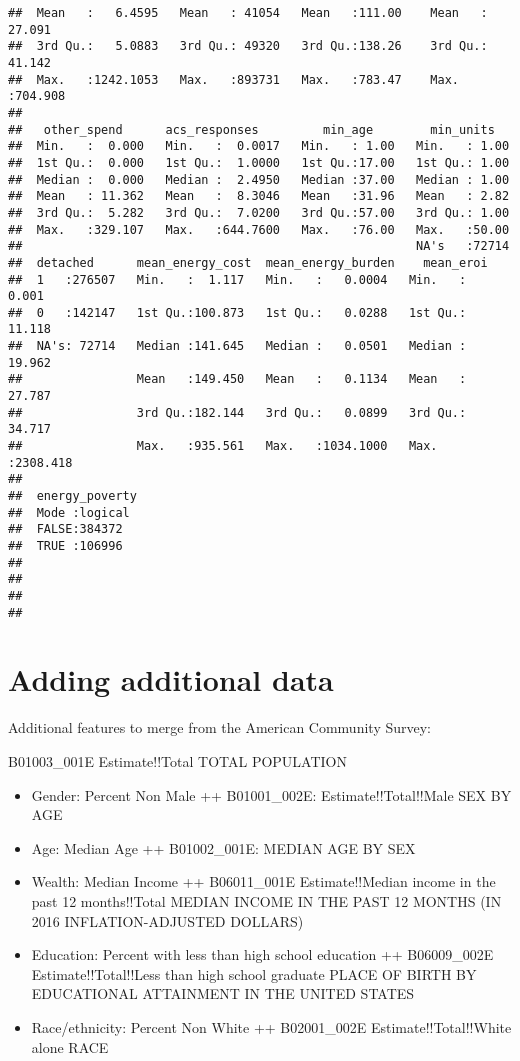 \documentclass[]{article}
\providecommand{\tightlist}{%
  \setlength{\itemsep}{0pt}\setlength{\parskip}{0pt}}
\begin{document}
\begin{verbatim}
##  Mean   :   6.4595   Mean   : 41054   Mean   :111.00    Mean   : 27.091  
##  3rd Qu.:   5.0883   3rd Qu.: 49320   3rd Qu.:138.26    3rd Qu.: 41.142  
##  Max.   :1242.1053   Max.   :893731   Max.   :783.47    Max.   :704.908  
##                                                                          
##   other_spend      acs_responses         min_age        min_units    
##  Min.   :  0.000   Min.   :  0.0017   Min.   : 1.00   Min.   : 1.00  
##  1st Qu.:  0.000   1st Qu.:  1.0000   1st Qu.:17.00   1st Qu.: 1.00  
##  Median :  0.000   Median :  2.4950   Median :37.00   Median : 1.00  
##  Mean   : 11.362   Mean   :  8.3046   Mean   :31.96   Mean   : 2.82  
##  3rd Qu.:  5.282   3rd Qu.:  7.0200   3rd Qu.:57.00   3rd Qu.: 1.00  
##  Max.   :329.107   Max.   :644.7600   Max.   :76.00   Max.   :50.00  
##                                                       NA's   :72714  
##  detached      mean_energy_cost  mean_energy_burden    mean_eroi       
##  1   :276507   Min.   :  1.117   Min.   :   0.0004   Min.   :   0.001  
##  0   :142147   1st Qu.:100.873   1st Qu.:   0.0288   1st Qu.:  11.118  
##  NA's: 72714   Median :141.645   Median :   0.0501   Median :  19.962  
##                Mean   :149.450   Mean   :   0.1134   Mean   :  27.787  
##                3rd Qu.:182.144   3rd Qu.:   0.0899   3rd Qu.:  34.717  
##                Max.   :935.561   Max.   :1034.1000   Max.   :2308.418  
##                                                                        
##  energy_poverty 
##  Mode :logical  
##  FALSE:384372   
##  TRUE :106996   
##                 
##                 
##                 
## 
\end{verbatim}

\hypertarget{adding-additional-data}{%
\section{Adding additional data}\label{adding-additional-data}}

Additional features to merge from the American Community Survey:

B01003\_001E Estimate!!Total TOTAL POPULATION

\begin{itemize}
\tightlist
\item
  Gender: Percent Non Male ++ B01001\_002E: Estimate!!Total!!Male SEX BY
  AGE
\item
  Age: Median Age ++ B01002\_001E: MEDIAN AGE BY SEX
\item
  Wealth: Median Income ++ B06011\_001E Estimate!!Median income in the
  past 12 months!!Total MEDIAN INCOME IN THE PAST 12 MONTHS (IN 2016
  INFLATION-ADJUSTED DOLLARS)
\item
  Education: Percent with less than high school education ++
  B06009\_002E Estimate!!Total!!Less than high school graduate PLACE OF
  BIRTH BY EDUCATIONAL ATTAINMENT IN THE UNITED STATES
\item
  Race/ethnicity: Percent Non White ++ B02001\_002E
  Estimate!!Total!!White alone RACE
\end{itemize}
\end{document}
